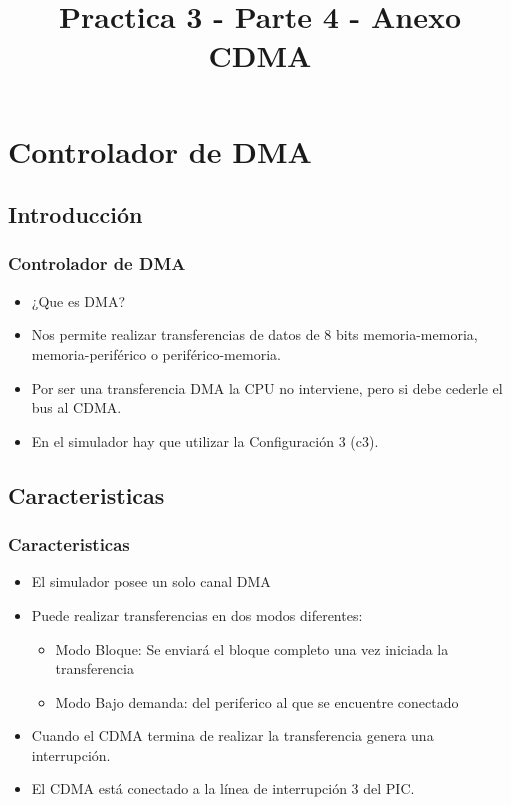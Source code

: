\documentclass{beamer}
\title{Practica 3 - Parte 4 - Anexo CDMA}
\begin{document}
\begin{frame}
\titlepage
\end{frame}

\section{Controlador de DMA}
\subsection{Introducción}
\begin{frame}
\frametitle{Controlador de DMA}
\begin{itemize}
  \item ¿Que es DMA?
  \item Nos permite realizar transferencias de datos de 8 bits memoria-memoria, memoria-periférico o periférico-memoria.
  \item Por ser una transferencia DMA la CPU no interviene, pero si debe cederle el bus al CDMA.
  \item En el simulador hay que utilizar la Configuración 3 (c3).
\end{itemize}
\end{frame}

\subsection{Caracteristicas}
\begin{frame}
\frametitle{Caracteristicas}
\begin{itemize}
  \item El simulador posee un solo canal DMA
  \item Puede realizar transferencias en dos modos diferentes:
\begin{itemize}
  \item Modo Bloque: Se enviará el bloque completo una vez iniciada la transferencia
  \item Modo Bajo demanda: del periferico al que se encuentre conectado
\end{itemize}
  \item Cuando el CDMA termina de realizar la transferencia genera una interrupción.
  \item El CDMA está conectado a la línea de interrupción 3 del PIC.
\end{itemize}
\end{frame}
\end{document}
